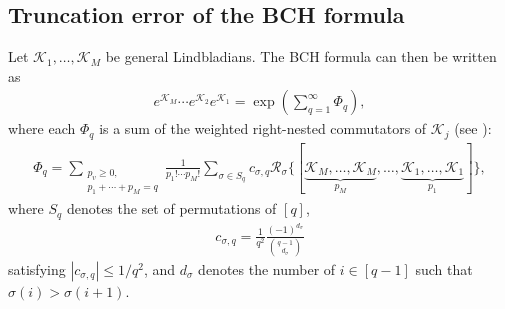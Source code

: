 \documentclass[aps,pra,reprint,groupedaddress,floatfix]{revtex4-2}
\newcommand{\mc}{\mathcal}
\begin{document}
\subsection{Truncation error of the BCH formula}
\label{sec:bch-truncate}
Let $\mc K_1, \ldots, \mc K_M$ be general Lindbladians. The BCH formula can then be written as
\begin{align}
\label{eq:def-bch}
 	e^{\mc K_M}\cdots e^{\mc K_2}e^{\mc K_1} = \exp(\sum_{q = 1}^{\infty} \Phi_q),
\end{align}
where each $\Phi_q$ is a sum of the weighted right-nested commutators of $\mc K_j$ (see \citet{arnal2021note}):
\begin{align}
\label{eq:bch}
 	\Phi_q = \sum_{\substack{p_v \ge 0,\\p_1+\cdots+p_M = q}}\frac{1}{p_1!\cdots p_M!} \sum_{\sigma\in S_q} c_{\sigma, q}\mc R_{\sigma}\{[\underbrace{\mc K_M, \ldots, \mc K_M}_{p_M}, \ldots, \underbrace{\mc K_1, \ldots, \mc K_1}_{p_1}]\},
\end{align}
where $S_q$ denotes the set of permutations of $[q]$, \begin{align}
\label{eq:def-c-sigma}
    c_{\sigma, q}=\frac{1}{q^2}\frac{(-1)^{d_{\sigma}}}{\binom{q-1}{d_\sigma}} 
\end{align} satisfying $|c_{\sigma, q}|\le 1/q^2$, and $d_{\sigma}$ denotes the number of $i\in[q-1]$ such that $\sigma(i)>\sigma(i+1)$.
\end{document}
